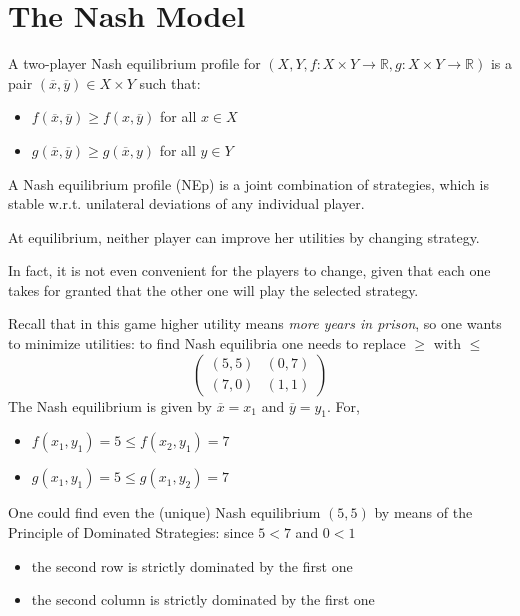 \documentclass[../main.tex]{subfiles}
\begin{document}
\chapter{The Nash Model}
\begin{definition}
    A two-player Nash equilibrium profile for $(X,Y, f: X \times Y \to \mathbb{R}, g: X \times Y \to \mathbb{R})$ is a pair $(\overline{x}, \overline{y}) \in X \times Y$ such that:
    \begin{itemize}[noitemsep]
        \item $f(\overline{x}, \overline{y}) \geq f(x, \overline{y})$ for all $x \in X$
        \item $g(\overline{x}, \overline{y}) \geq g(\overline{x}, y)$ for all $y \in Y$
    \end{itemize}
    A Nash equilibrium profile (\gls{NEp}) is a joint combination of strategies, which is stable w.r.t. unilateral deviations of any individual player.
\end{definition}
At equilibrium, neither player can improve her utilities by changing strategy.

In fact, it is not even convenient for the players to change, given that each one takes for granted that the other one will play the selected strategy.

\begin{example}
    Recall that in this game higher utility means \textit{more years in prison}, so one wants to minimize utilities: to find Nash equilibria one needs to replace $\geq$ with $\leq$
    \[
        \begin{pmatrix}
            (5,5) & (0,7) \\
            (7,0) & (1,1)
        \end{pmatrix}
    \]
    The Nash equilibrium is given by $\overline{x} = x_1$ and $\overline{y} = y_1$. For,
    \begin{itemize}
        \item $f(x_1, y_1) = 5 \leq f(x_2, y_1) = 7$
        \item $g(x_1, y_1) = 5 \leq g(x_1, y_2) = 7$
    \end{itemize}
    \begin{note}
        One could find even the (unique) Nash equilibrium $(5,5)$ by means of the Principle of Dominated Strategies: since $5 < 7$ and $0 < 1$
        \begin{itemize}
            \item the second row is strictly dominated by the first one
            \item the second column is strictly dominated by the first one
        \end{itemize}
    \end{note}
\end{example}
\end{document}
